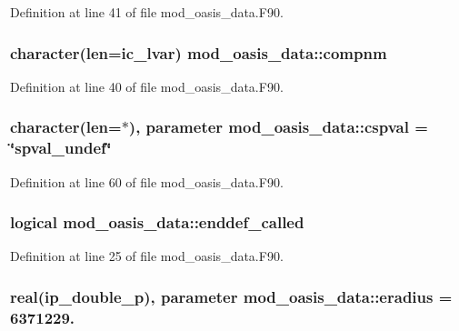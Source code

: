 Definition at line 41 of file mod\+\_\+oasis\+\_\+data.\+F90.

\hypertarget{classmod__oasis__data_a8379835615758ccf7a4287dde5785681}{
\subsubsection[{compnm}]{\setlength{\rightskip}{0pt plus 5cm}character(len=ic\+\_\+lvar) mod\+\_\+oasis\+\_\+data\+::compnm}}\label{classmod__oasis__data_a8379835615758ccf7a4287dde5785681}


Definition at line 40 of file mod\+\_\+oasis\+\_\+data.\+F90.

\hypertarget{classmod__oasis__data_acfb160b3d147e7cb667b0dc0f5bb2960}{
\subsubsection[{cspval}]{\setlength{\rightskip}{0pt plus 5cm}character(len=$\ast$), parameter mod\+\_\+oasis\+\_\+data\+::cspval = \char`\"{}spval\+\_\+undef\char`\"{}}}\label{classmod__oasis__data_acfb160b3d147e7cb667b0dc0f5bb2960}


Definition at line 60 of file mod\+\_\+oasis\+\_\+data.\+F90.

\hypertarget{classmod__oasis__data_a5341a9152ef540667f7fcaa4f04c6399}{
\subsubsection[{enddef\+\_\+called}]{\setlength{\rightskip}{0pt plus 5cm}logical mod\+\_\+oasis\+\_\+data\+::enddef\+\_\+called}}\label{classmod__oasis__data_a5341a9152ef540667f7fcaa4f04c6399}


Definition at line 25 of file mod\+\_\+oasis\+\_\+data.\+F90.

\hypertarget{classmod__oasis__data_a7f361db125e5554d0427e964b698f10c}{
\subsubsection[{eradius}]{\setlength{\rightskip}{0pt plus 5cm}real(ip\+\_\+double\+\_\+p), parameter mod\+\_\+oasis\+\_\+data\+::eradius = 6371229.}}\label{classmod__oasis__data_a7f361db125e5554d0427e964b698f10c}


